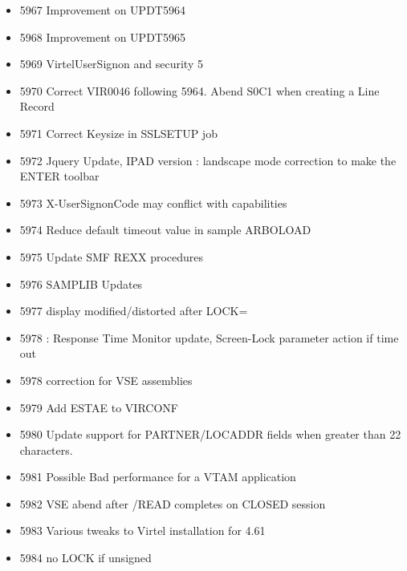 \documentclass[letterpaper,10pt,english]{sphinxmanual}
\begin{document}
\begin{itemize}
\item {} 
5967 Improvement on UPDT5964

\item {} 
5968 Improvement on UPDT5965

\item {} 
5969 VirtelUserSignon and security 5

\item {} 
5970 Correct VIR0046 following 5964. Abend S0C1 when creating a Line Record

\item {} 
5971 Correct Keysize in SSLSETUP job

\item {} 
5972 Jquery Update, IPAD version : landscape mode correction to make the ENTER toolbar

\item {} 
5973 X-UserSignonCode may conflict with capabilities

\item {} 
5974 Reduce default timeout value in sample ARBOLOAD

\item {} 
5975 Update SMF REXX procedures

\item {} 
5976 SAMPLIB Updates

\item {} 
5977 display modified/distorted after LOCK=

\item {} 
5978 : Response Time Monitor update, Screen-Lock parameter action if time out

\item {} 
5978 correction for VSE assemblies

\item {} 
5979 Add ESTAE to VIRCONF

\item {} 
5980 Update support for PARTNER/LOCADDR fields when greater than 22 characters.

\item {} 
5981 Possible Bad performance for a VTAM application

\item {} 
5982 VSE abend after /READ completes on CLOSED session

\item {} 
5983 Various tweaks to Virtel installation for 4.61

\item {} 
5984 no LOCK if unsigned


\end{itemize}
\end{document}
